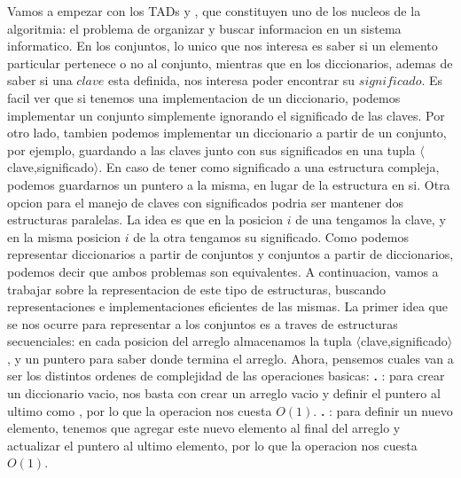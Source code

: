 \documentclass[10pt,a4paper]{article}
\begin{document}
Vamos a empezar con los TADs  y , que constituyen uno de los nucleos de la algoritmia: el problema de organizar y buscar informacion en un sistema informatico. En los conjuntos, lo unico que nos interesa es saber si un elemento particular pertenece o no al conjunto, mientras que en los diccionarios, ademas de saber si una $clave$ esta definida, nos interesa poder encontrar su $significado$.
\newline
\newline
Es facil ver que si tenemos una implementacion de un diccionario, podemos implementar un conjunto simplemente ignorando el significado de las claves. Por otro lado, tambien podemos implementar un diccionario a partir de un conjunto, por ejemplo, guardando a las claves junto con sus significados en una tupla $\langle$clave,significado$\rangle$. En caso de tener como significado a una estructura compleja, podemos guardarnos un puntero a la misma, en lugar de la estructura en si. Otra opcion para el manejo de claves con significados podria ser mantener dos estructuras paralelas. La idea es que en la posicion $i$
de una tengamos la clave, y en la misma posicion $i$ de la otra tengamos su significado. Como podemos representar diccionarios a partir de conjuntos y conjuntos a partir de diccionarios, podemos decir que ambos problemas son equivalentes. A continuacion, vamos a trabajar sobre la representacion de este tipo de estructuras, buscando representaciones e implementaciones eficientes de las mismas.
\newline
\newline
La primer idea que se nos ocurre para representar a los conjuntos es a traves de estructuras secuenciales: en cada posicion del arreglo almacenamos la tupla $\langle$clave,significado$\rangle$, y un puntero para saber donde termina el arreglo.
\newline
\newline
Ahora, pensemos cuales van a ser los distintos ordenes de complejidad de las operaciones basicas:
\newline
\newline
\textbf{.} : para crear un diccionario vacio, nos basta con crear un arreglo vacio y definir el puntero al ultimo como , por lo que la operacion nos cuesta $O(1)$.
\newline
\newline
\textbf{.} : para definir un nuevo elemento, tenemos que agregar este nuevo elemento al final del arreglo y actualizar el puntero al ultimo elemento, por lo que la operacion nos cuesta $O(1)$.
\end{document}
